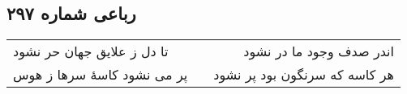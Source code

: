 \begin{center}
\section*{رباعی شماره ۲۹۷}
\label{sec:sh297}
\begin{longtable}{l p{0.5cm} r}
تا دل ز علایق جهان حر نشود
&&
اندر صدف وجود ما در نشود
\\
پر می نشود کاسهٔ سرها ز هوس
&&
هر کاسه که سرنگون بود پر نشود
\\
\end{longtable}
\end{center}
